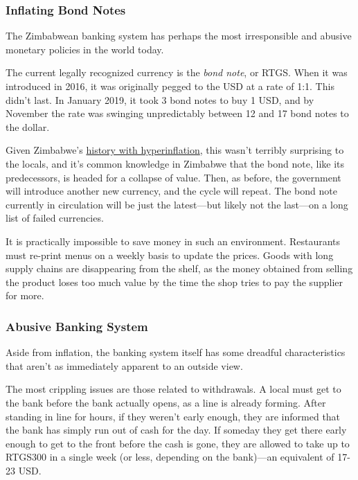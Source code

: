 \documentclass{article}
\begin{document}
\subsubsection{Inflating Bond Notes} \label{inflation}

The Zimbabwean banking system has perhaps the most irresponsible and abusive monetary policies in the world today.

The current legally recognized currency is the \textit{bond note}, or RTGS. When it was introduced in 2016, it was originally pegged to the USD at a rate of 1:1. This didn't last. In January 2019, it took 3 bond notes to buy 1 USD, and by November the rate was swinging unpredictably between 12 and 17 bond notes to the dollar.

Given Zimbabwe's \href{https://en.wikipedia.org/wiki/Hyperinflation_in_Zimbabwe}{history with hyperinflation}, this wasn't terribly surprising to the locals, and it's common knowledge in Zimbabwe that the bond note, like its predecessors, is headed for a collapse of value. Then, as before, the government will introduce another new currency, and the cycle will repeat. The bond note currently in circulation will be just the latest---but likely not the last---on a long list of failed currencies.

It is practically impossible to save money in such an environment. Restaurants must re-print menus on a weekly basis to update the prices. Goods with long supply chains are disappearing from the shelf, as the money obtained from selling the product loses too much value by the time the shop tries to pay the supplier for more.

\subsubsection{Abusive Banking System} \label{banking}

Aside from inflation, the banking system itself has some dreadful characteristics that aren't as immediately apparent to an outside view.

The most crippling issues are those related to withdrawals. A local must get to the bank before the bank actually opens, as a line is already forming. After standing in line for hours, if they weren't early enough, they are informed that the bank has simply run out of cash for the day. If someday they get there early enough to get to the front before the cash is gone, they are allowed to take up to RTGS300 in a single week (or less, depending on the bank)---an equivalent of 17-23 USD.
\end{document}
